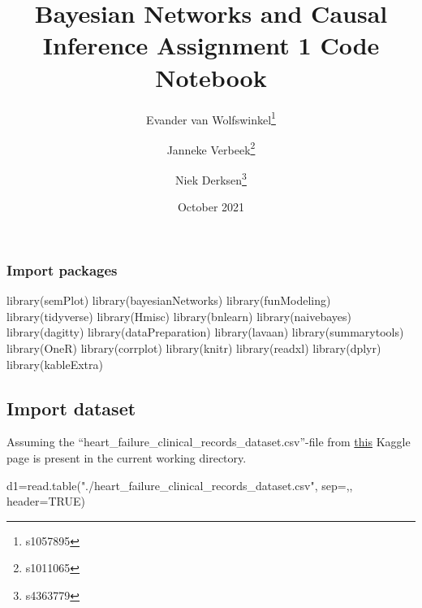 \documentclass[
]{article}
\title{Bayesian Networks and Causal Inference Assignment 1 Code
Notebook}
\author{Evander van Wolfswinkel\footnote{s1057895} \and Janneke
Verbeek\footnote{s1011065} \and Niek Derksen\footnote{s4363779}}
\date{October 2021}
\newenvironment{Shaded}{\begin{snugshade}}{\end{snugshade}}
\newcommand{\AttributeTok}[1]{\textcolor[rgb]{0.77,0.63,0.00}{#1}}
\newcommand{\ConstantTok}[1]{\textcolor[rgb]{0.00,0.00,0.00}{#1}}
\newcommand{\FunctionTok}[1]{\textcolor[rgb]{0.00,0.00,0.00}{#1}}
\newcommand{\NormalTok}[1]{#1}
\newcommand{\OtherTok}[1]{\textcolor[rgb]{0.56,0.35,0.01}{#1}}
\newcommand{\StringTok}[1]{\textcolor[rgb]{0.31,0.60,0.02}{#1}}
\begin{document}
\maketitle

\small

\hypertarget{import-packages}{%
\subsubsection{Import packages}\label{import-packages}}

\begin{Shaded}
\begin{Highlighting}[]
\FunctionTok{library}\NormalTok{(semPlot)}
\FunctionTok{library}\NormalTok{(bayesianNetworks)}
\FunctionTok{library}\NormalTok{(funModeling) }
\FunctionTok{library}\NormalTok{(tidyverse) }
\FunctionTok{library}\NormalTok{(Hmisc)}
\FunctionTok{library}\NormalTok{(bnlearn)}
\FunctionTok{library}\NormalTok{(naivebayes)}
\FunctionTok{library}\NormalTok{(dagitty)}
\FunctionTok{library}\NormalTok{(dataPreparation)}
\FunctionTok{library}\NormalTok{(lavaan)}
\FunctionTok{library}\NormalTok{(summarytools)}
\FunctionTok{library}\NormalTok{(OneR)}
\FunctionTok{library}\NormalTok{(corrplot)}
\FunctionTok{library}\NormalTok{(knitr)}
\FunctionTok{library}\NormalTok{(readxl)}
\FunctionTok{library}\NormalTok{(dplyr)}
\FunctionTok{library}\NormalTok{(kableExtra)}
\end{Highlighting}
\end{Shaded}

\normalsize
\newpage

\hypertarget{import-dataset}{%
\subsection{Import dataset}\label{import-dataset}}

Assuming the ``heart\_failure\_clinical\_records\_dataset.csv''-file
from
\href{https://www.kaggle.com/andrewmvd/heart-failure-clinical-data/download}{this}
Kaggle page is present in the current working directory.

\begin{Shaded}
\begin{Highlighting}[]
\NormalTok{d1}\OtherTok{=}\FunctionTok{read.table}\NormalTok{(}\StringTok{"./heart\_failure\_clinical\_records\_dataset.csv"}\NormalTok{, }\AttributeTok{sep=}\StringTok{\textquotesingle{},\textquotesingle{}}\NormalTok{, }\AttributeTok{header=}\ConstantTok{TRUE}\NormalTok{)}
\end{Highlighting}
\end{Shaded}
\end{document}
